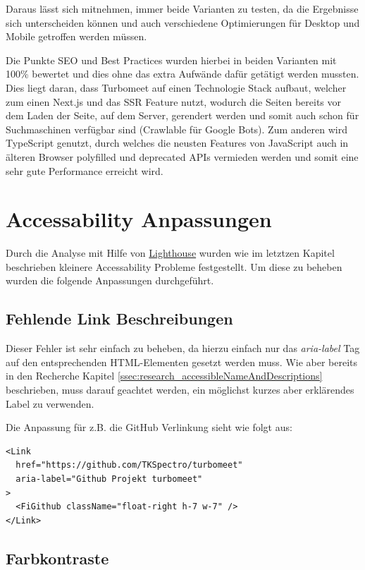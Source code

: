 Daraus lässt sich mitnehmen, immer beide Varianten zu testen, da die Ergebnisse sich unterscheiden können und auch verschiedene Optimierungen für Desktop und Mobile getroffen werden müssen. 

Die Punkte SEO und Best Practices wurden hierbei in beiden Varianten mit 100\% bewertet und dies ohne das extra Aufwände dafür getätigt werden mussten. Dies liegt daran, dass Turbomeet auf einen Technologie Stack aufbaut, welcher zum einen Next.js und das SSR Feature nutzt, wodurch die Seiten bereits vor dem Laden der Seite, auf dem Server, gerendert werden und somit auch schon für Suchmaschinen verfügbar sind (Crawlable für Google Bots). Zum anderen wird TypeScript genutzt, durch welches die neusten Features von JavaScript auch in älteren Browser polyfilled und deprecated APIs vermieden werden und somit eine sehr gute Performance erreicht wird.

\section{Accessability Anpassungen}

Durch die Analyse mit Hilfe von \hyperref[ssec:lighthouse]{Lighthouse} wurden wie im letztzen Kapitel beschrieben kleinere Accessability Probleme festgestellt. Um diese zu beheben wurden die folgende Anpassungen durchgeführt.

\subsection{Fehlende Link Beschreibungen}

Dieser Fehler ist sehr einfach zu beheben, da hierzu einfach nur das \emph{aria-label} Tag auf den entsprechenden HTML-Elementen gesetzt werden muss.
Wie aber bereits in den Recherche Kapitel \ref{ssec:research_accessibleNameAndDescriptions} beschrieben, muss darauf geachtet werden, ein möglichst kurzes aber erklärendes Label zu verwenden.

Die Anpassung für z.B. die GitHub Verlinkung sieht wie folgt aus:

\begin{lstlisting}
<Link
  href="https://github.com/TKSpectro/turbomeet"
  aria-label="Github Projekt turbomeet"
>
  <FiGithub className="float-right h-7 w-7" />
</Link>
\end{lstlisting}

\subsection{Farbkontraste}

